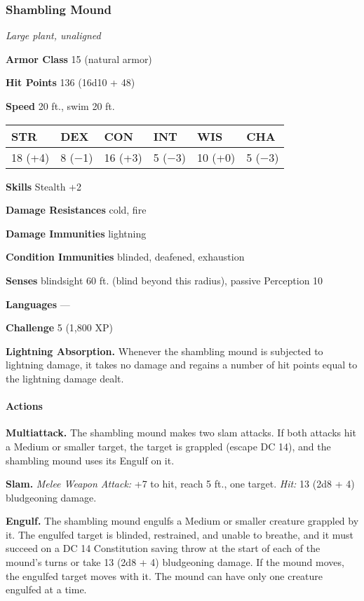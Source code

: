 \documentclass[
]{article}
\begin{document}
\hypertarget{shambling-mound}{%
\subsubsection{Shambling Mound}\label{shambling-mound}}

\emph{Large plant, unaligned}

\textbf{Armor Class} 15 (natural armor)

\textbf{Hit Points} 136 (16d10 + 48)

\textbf{Speed} 20 ft., swim 20 ft.

\begin{longtable}[]{@{}llllll@{}}
\toprule
STR & DEX & CON & INT & WIS & CHA\tabularnewline
\midrule
\endhead
18 (+4) & 8 (−1) & 16 (+3) & 5 (−3) & 10 (+0) & 5 (−3)\tabularnewline
\bottomrule
\end{longtable}

\textbf{Skills} Stealth +2

\textbf{Damage Resistances} cold, fire

\textbf{Damage Immunities} lightning

\textbf{Condition Immunities} blinded, deafened, exhaustion

\textbf{Senses} blindsight 60 ft. (blind beyond this radius), passive
Perception 10

\textbf{Languages} ---

\textbf{Challenge} 5 (1,800 XP)

\textbf{Lightning Absorption.} Whenever the shambling mound is subjected
to lightning damage, it takes no damage and regains a number of hit
points equal to the lightning damage dealt.

\hypertarget{actions-4}{%
\paragraph{Actions}\label{actions-4}}

\textbf{Multiattack.} The shambling mound makes two slam attacks. If
both attacks hit a Medium or smaller target, the target is grappled
(escape DC 14), and the shambling mound uses its Engulf on it.

\textbf{Slam.} \emph{Melee Weapon Attack:} +7 to hit, reach 5 ft., one
target. \emph{Hit:} 13 (2d8 + 4) bludgeoning damage.

\textbf{Engulf.} The shambling mound engulfs a Medium or smaller
creature grappled by it. The engulfed target is blinded, restrained, and
unable to breathe, and it must succeed on a DC 14 Constitution saving
throw at the start of each of the mound's turns or take 13 (2d8 + 4)
bludgeoning damage. If the mound moves, the engulfed target moves with
it. The mound can have only one creature engulfed at a time.
\end{document}
